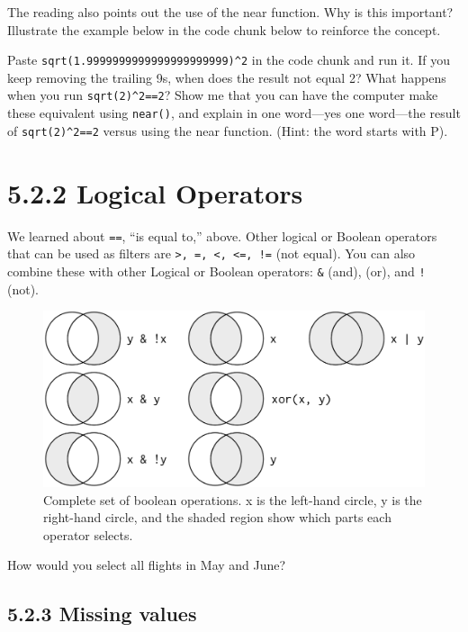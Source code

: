 \documentclass[
]{article}
\begin{document}
The reading also points out the use of the near function. Why is this
important? Illustrate the example below in the code chunk below to
reinforce the concept.

Paste \texttt{sqrt(1.9999999999999999999999)\^{}2} in the code chunk and
run it. If you keep removing the trailing 9s, when does the result not
equal 2? What happens when you run \texttt{sqrt(2)\^{}2==2}? Show me
that you can have the computer make these equivalent using
\texttt{near()}, and explain in one word---yes one word---the result of
\texttt{sqrt(2)\^{}2==2} versus using the near function. (Hint: the word
starts with P).

\hypertarget{logical-operators}{%
\section{5.2.2 Logical Operators}\label{logical-operators}}

We learned about \texttt{==}, ``is equal to,'' above. Other logical or
Boolean operators that can be used as filters are
\texttt{\textgreater{},\ =,\ \textless{},\ \textless{}=,\ !=} (not
equal). You can also combine these with other Logical or Boolean
operators: \texttt{\&} (and), \texttt{\textbar{}} (or), and \texttt{!}
(not).

\begin{figure}
\centering
\includegraphics{transform-logical.png}
\caption{Complete set of boolean operations. x is the left-hand circle,
y is the right-hand circle, and the shaded region show which parts each
operator selects.}
\end{figure}

How would you select all flights in May and June?

\hypertarget{missing-values}{%
\subsection{5.2.3 Missing values}\label{missing-values}}
\end{document}
